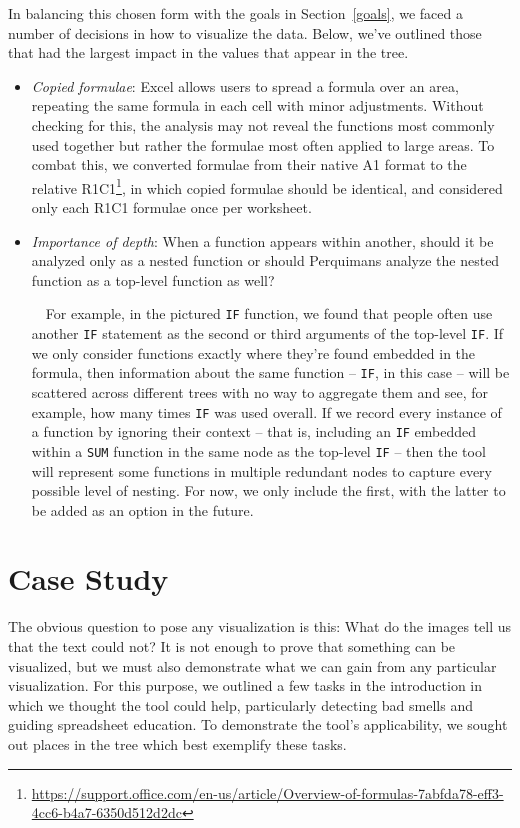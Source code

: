 \documentclass[conference]{IEEEtran}
\newcommand{\toolname}{Perquimans\xspace} \newcommand{\toolnameend}{Perquimans}
\begin{document}
	In balancing this chosen form with the goals in Section~\ref{goals}, we faced a
	number of decisions in how to visualize the data. Below, we've outlined those
	that had the largest impact in the values that appear in the tree.
	\begin{itemize}
		
		\item \textit{Copied formulae}: Excel allows users to spread a formula over an
		area, repeating the same formula in each cell with minor adjustments. Without
		checking for this, the analysis may not reveal the functions most commonly
		used together but rather the formulae most often applied to large areas. To
		combat this, we converted formulae from their native A1 format to the relative
		R1C1\footnote{\href{https://support.office.com/en-us/article/Overview-of-formulas-7abfda78-eff3-4cc6-b4a7-6350d512d2dc}{https://support.office.com/en-us/article/Overview-of-formulas-7abfda78-eff3-4cc6-b4a7-6350d512d2dc}}, in which copied formulae should be identical, and considered only each
		R1C1 formulae once per worksheet.
		
		\item \textit{Importance of depth}: When a function appears within another,
		should it be analyzed only as a nested function or should \toolname
		analyze the nested function as a top-level function as well? 
		
		\ \ For example, in the pictured \texttt{IF} function, we found that people
		often use another \texttt{IF} statement as the second or third arguments of
		the top-level \texttt{IF}. If we only consider functions exactly where they're
		found embedded in the formula, then information about the same function --
		\texttt{IF}, in this case -- will be scattered across different trees with no
		way to aggregate them and see, for example, how many times \texttt{IF} was
		used overall. If we record every instance of a function by ignoring their
		context -- that is, including an \texttt{IF} embedded within a \texttt{SUM}
		function in the same node as the top-level \texttt{IF} -- then the tool will
		represent some functions in multiple redundant nodes to capture every possible
		level of nesting. For now, we only include the first, with the latter to be
		added as an option in the future.
		
	\end{itemize}
	
	\section{Case Study} The obvious question to pose any visualization is this:
	What do the images tell us that the text could not? It is not enough to prove
	that something can be visualized, but we must also demonstrate what we can gain
	from any particular visualization. For this purpose, we outlined a few tasks in the
	introduction in which we thought the tool could help, particularly detecting bad smells and
	guiding spreadsheet education. To demonstrate the tool's applicability, we
	sought out places in the tree which best exemplify these tasks.
	
\end{document}
